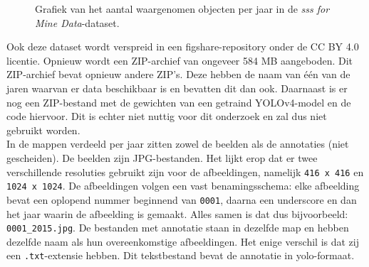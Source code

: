 \begin{figure}[H]
    \centering
    \caption[Aantal objecten per jaar in SSS for Mine Detection.]{\label{fig:SSSFMD_objects_per_year}Grafiek van het aantal waargenomen objecten per jaar in de \emph{\gls{sss} for Mine Data}-dataset. \autocite{Pessanha_Santos_2024}}
\end{figure}

Ook deze dataset wordt verspreid in een figshare-repository onder de CC BY 4.0 licentie. Opnieuw wordt een ZIP-archief van ongeveer 584 MB aangeboden. Dit ZIP-archief bevat opnieuw andere ZIP's. Deze hebben de naam van één van de jaren waarvan er data beschikbaar is en bevatten dit dan ook. Daarnaast is er nog een ZIP-bestand met de gewichten van een getraind \gls{YOLO}v4-model en de code hiervoor. Dit is echter niet nuttig voor dit onderzoek en zal dus niet gebruikt worden. \\

In de mappen verdeeld per jaar zitten zowel de beelden als de annotaties (niet gescheiden). De beelden zijn JPG-bestanden. Het lijkt erop dat er twee verschillende resoluties gebruikt zijn voor de afbeeldingen, namelijk \texttt{416 x 416} en \texttt{1024 x 1024}. De afbeeldingen volgen een vast benamingsschema: elke afbeelding bevat een oplopend nummer beginnend van \texttt{0001}, daarna een underscore en dan het jaar waarin de afbeelding is gemaakt. Alles samen is dat dus bijvoorbeeld: \texttt{0001\_2015.jpg}. De bestanden met annotatie staan in dezelfde map en hebben dezelfde naam als hun overeenkomstige afbeeldingen. Het enige verschil is dat zij een \texttt{.txt}-extensie hebben. Dit tekstbestand bevat de annotatie in \gls{yolo}-formaat. \autocite{Pessanha_Santos_2024_SSSFMD}

